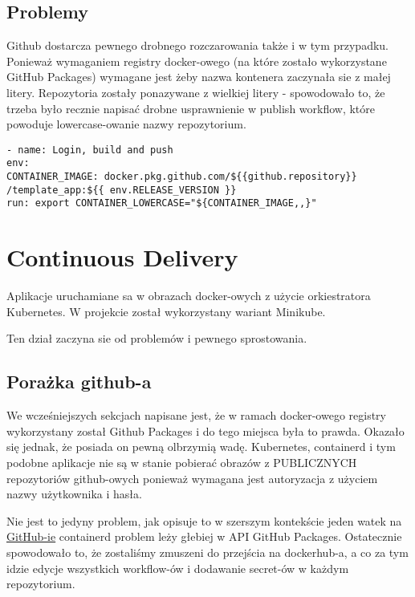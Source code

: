 \subsection{Problemy}
Github dostarcza pewnego drobnego rozczarowania także i w tym przypadku. Ponieważ wymaganiem registry docker-owego (na które zostało wykorzystane GitHub Packages) wymagane jest żeby nazwa kontenera zaczynała sie z małej litery. Repozytoria zostały ponazywane z wielkiej litery - spowodowało to, że trzeba było recznie napisać drobne usprawnienie w publish workflow, które powoduje lowercase-owanie nazwy repozytorium. 

\begin{verbatim}
- name: Login, build and push
env:
CONTAINER_IMAGE: docker.pkg.github.com/${{github.repository}}
/template_app:${{ env.RELEASE_VERSION }}
run: export CONTAINER_LOWERCASE="${CONTAINER_IMAGE,,}"
\end{verbatim}

\newpage
\section{Continuous Delivery}
Aplikacje uruchamiane sa w obrazach docker-owych z użycie orkiestratora Kubernetes. W projekcie został wykorzystany wariant Minikube. 

Ten dział zaczyna sie od problemów i pewnego sprostowania.

\subsection{Porażka github-a}
We wcześniejszych sekcjach napisane jest, że w ramach docker-owego registry wykorzystany został Github Packages i do tego miejsca była to prawda. Okazało się jednak, że posiada on pewną olbrzymią wadę. Kubernetes, containerd i tym podobne aplikacje nie są w stanie pobierać obrazów z PUBLICZNYCH repozytoriów github-owych ponieważ wymagana jest autoryzacja z użyciem nazwy użytkownika i hasła.

Nie jest to jedyny problem, jak opisuje to w szerszym kontekście jeden watek na \href{https://github.com/containerd/containerd/issues/3291}{GitHub-ie} containerd problem leży głebiej w API GitHub Packages. Ostatecznie spowodowało to, że zostaliśmy zmuszeni do przejścia na dockerhub-a, a co za tym idzie edycje wszystkich workflow-ów i dodawanie secret-ów w każdym repozytorium.

\subsection{}